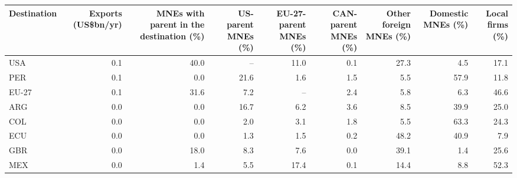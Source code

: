 \begin{tabular}{lrrrrrrrr}
\toprule
Destination & \multicolumn{1}{p{1.5cm}}{\raggedright Exports (US\$bn/yr)} & \multicolumn{1}{p{2.2cm}}{\raggedright MNEs with parent in the destination (\%)} & \multicolumn{1}{p{1.6cm}}{\raggedright US-parent MNEs (\%)} & \multicolumn{1}{p{1.6cm}}{\raggedright EU-27-parent MNEs (\%)} & \multicolumn{1}{p{1.6cm}}{\raggedright CAN-parent MNEs (\%)} & \multicolumn{1}{p{1.6cm}}{\raggedright Other foreign MNEs (\%)} & \multicolumn{1}{p{1.6cm}}{\raggedright Domestic MNEs (\%)} & \multicolumn{1}{p{1.5cm}}{\raggedright Local firms (\%)} \\
\midrule
USA & 0.1 & 40.0 & -- & 11.0 & 0.1 & 27.3 & 4.5 & 17.1 \\
PER & 0.1 & 0.0 & 21.6 & 1.6 & 1.5 & 5.5 & 57.9 & 11.8 \\
EU-27 & 0.1 & 31.6 & 7.2 & -- & 2.4 & 5.8 & 6.3 & 46.6 \\
ARG & 0.0 & 0.0 & 16.7 & 6.2 & 3.6 & 8.5 & 39.9 & 25.0 \\
COL & 0.0 & 0.0 & 2.0 & 3.1 & 1.8 & 5.5 & 63.3 & 24.3 \\
ECU & 0.0 & 0.0 & 1.3 & 1.5 & 0.2 & 48.2 & 40.9 & 7.9 \\
GBR & 0.0 & 18.0 & 8.3 & 7.6 & 0.0 & 39.1 & 1.4 & 25.6 \\
MEX & 0.0 & 1.4 & 5.5 & 17.4 & 0.1 & 14.4 & 8.8 & 52.3 \\
\bottomrule
\end{tabular}
